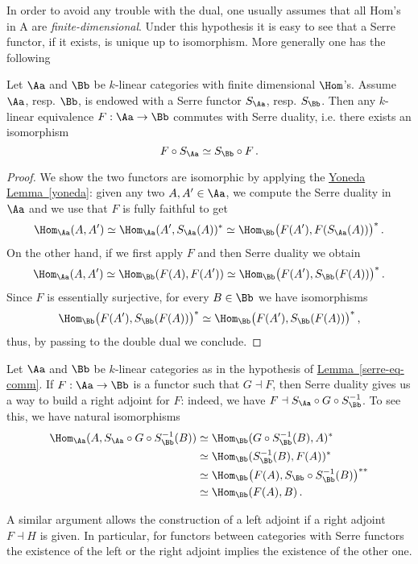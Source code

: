 In order to avoid any trouble with the dual, 
one usually assumes that all Hom’s in A are \emph{finite-dimensional}. 
Under this hypothesis it is easy to see that a Serre functor, 
if it exists, is unique up to isomorphism. 
More generally one has the following

\begin{lemma}\label{serre-eq-comm}
    Let $\Aa$ and $\Bb$ be $k$-linear categories with
    finite dimensional $\Hom$'s. Assume $\Aa$, resp. $\Bb$,
    is endowed with a Serre functor $S_{\Aa}$, resp. $S_{\Bb}$.
    Then any $k$-linear equivalence $F:\Aa \to \Bb$ commutes
    with Serre duality, i.e. there exists an isomorphism
    \begin{equation*}
        F \circ S_{\Aa} \simeq S_{\Bb} \circ F\,.
    \end{equation*}
    \begin{proof}
        We show the two functors are isomorphic
        by applying the \hyperref[yoneda]{Yoneda Lemma~\ref*{yoneda}}:
        given any two $A, A' \in \Aa$, 
        we compute the Serre duality in $\Aa$
        and we use that $F$
        is fully faithful to get
        \begin{align*}
            \Hom_{\Aa}(A,A') \simeq \Hom_{\Aa}(A',S_{\Aa}(A))^* 
            \simeq \Hom_{\Bb}\big(F(A'),F(S_{\Aa}(A))\big)^*\,.
        \end{align*}
        On the other hand, if we first apply $F$ and then Serre duality
        we obtain
        \begin{align*}
            \Hom_{\Aa}(A,A') 
            \simeq \Hom_{\Bb}(F(A),F(A'))
            \simeq \Hom_{\Bb}\big(F(A'),S_{\Bb}(F(A))\big)^*\,.
        \end{align*}
        Since $F$ is essentially surjective, 
        for every $B \in \Bb$ we have isomorphisms
        \begin{align*}
            \Hom_{\Bb}\big(F(A'),S_{\Bb}(F(A))\big)^*
            \simeq \Hom_{\Bb}\big(F(A'),S_{\Bb}(F(A))\big)^*\,,
        \end{align*}
        thus, by passing to the double dual we conclude.
    \end{proof}
\end{lemma}

\begin{rmk}
    Let $\Aa$ and $\Bb$ be $k$-linear categories 
    as in the hypothesis of \hyperref[serre-eq-comm]{Lemma~\ref*{serre-eq-comm}}.
    If $F: \Aa \to \Bb$ is a functor such that $G \dashv F$,
    then Serre duality gives us a way to build a right adjoint for $F$:
    indeed, we have $F \dashv S_{\Aa} \circ  G \circ S_{\Bb}^{-1}$.
    To see this,  we have natural isomorphisms
    \begin{align*}
        \Hom_{\Aa}(A, S_{\Aa} \circ  G \circ S_{\Bb}^{-1}(B)) 
        &\simeq \Hom_{\Bb}(G \circ S_{\Bb}^{-1}(B),A)^{*} \\
        &\simeq \Hom_{\Bb}(S_{\Bb}^{-1}(B),F(A))^{*} \\
        &\simeq \Hom_{\Bb} \big(F(A), S_{\Bb} \circ S_{\Bb}^{-1}(B)\big)^{**} \\
        &\simeq \Hom_{\Bb}(F(A),B)\,.
    \end{align*}
\end{rmk}

 A similar argument allows the construction of 
 a left adjoint if a right adjoint 
 $F \dashv H$ is given. 
 In particular, for functors between categories with 
 Serre functors the existence of the left or 
 the right adjoint implies the existence of the other one.
